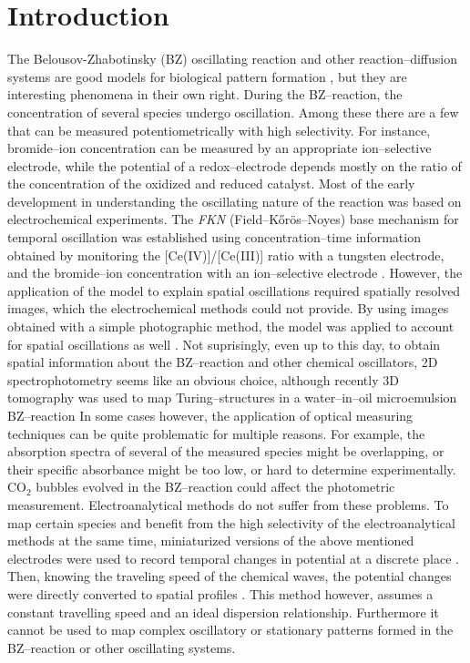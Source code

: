 \documentclass[3p, twocolumn]{elsarticle}
\begin{document}
\section{Introduction}
The Belousov-Zhabotinsky (BZ) oscillating reaction and other reaction--diffusion systems are good models for biological pattern formation \cite{kondo2010reaction}, but they are interesting phenomena in their own right.
During the BZ--reaction, the concentration of several species undergo oscillation.
Among these there are a few that can be measured potentiometrically with high selectivity.
For instance, bromide--ion concentration can be measured by an appropriate ion--selective electrode, while the potential of a redox--electrode depends mostly on the ratio of the concentration of the oxidized and reduced catalyst.
Most of the early development in understanding the oscillating nature of the reaction was based on electrochemical experiments.
The \emph{FKN} (Field--Kőrös--Noyes) base mechanism for temporal oscillation was established using concentration--time information obtained by monitoring the [Ce(IV)]/[Ce(III)] ratio with a tungsten electrode, and the bromide--ion concentration with an ion--selective electrode \cite{noyes1972oscillations, field1972oscillations, field1974oscillationsIV}.
However, the application of the model to explain spatial oscillations required spatially resolved images, which the electrochemical methods could not provide.
By using images obtained with a simple photographic method, the model was applied to account for spatial oscillations as well \cite{field1974oscillationsV}.
Not suprisingly, even up to this day, to obtain spatial information about the BZ--reaction and other chemical oscillators, 2D spectrophotometry seems like an obvious choice, although recently 3D tomography was used to map Turing--structures in a water--in--oil microemulsion BZ--reaction \cite{bansagi2011tomography}
In some cases however, the application of optical measuring techniques can be quite problematic for multiple reasons.
For example, the absorption spectra of several of the measured species might be overlapping, or their specific absorbance might be too low, or hard to determine experimentally.
CO$_2$ bubbles evolved in the BZ--reaction could affect the photometric measurement.
Electroanalytical methods do not suffer from these problems.
To map certain species and benefit from the high selectivity of the electroanalytical methods at the same time, miniaturized versions of the above mentioned electrodes were used to record temporal changes in potential at a discrete place \cite{nagy1990electrochemical}.
Then, knowing the traveling speed of the chemical waves, the potential changes were directly converted to spatial profiles \cite{nagy1991control}.
This method however, assumes a constant travelling speed and an ideal dispersion relationship.
Furthermore it cannot be used to map complex oscillatory or stationary patterns formed in the BZ--reaction or other oscillating systems.
\end{document}
